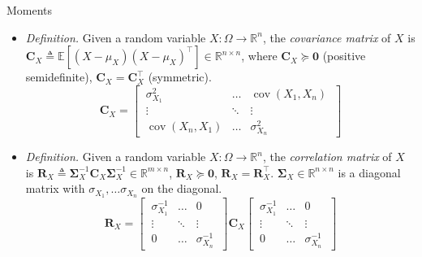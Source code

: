 \documentclass{beamer}
\numberwithin{equation}{section}
\begin{document}
\begin{frame}{Moments}
    \begin{itemize}
        \item
        \textit{Definition.} Given a random variable $ X : \Omega \rightarrow
        \mathbb{R}^n $, the \textit{covariance matrix} of $ X $ is
        $ \mathbf{C}_X \triangleq \mathbb{E}\left[(X - \mu_X)
        (X - \mu_X)^\top\right] \in \mathbb{R}^{n \times n} $, where
        $ \mathbf{C}_X \succeq \mathbf{0} $ (positive semidefinite),
        $ \mathbf{C}_X = \mathbf{C}_X^\top $ (symmetric).
        \begin{equation*}
            \mathbf{C}_X = \begin{bmatrix}
                \ \sigma_{X_1}^2 & \ldots & \operatorname{cov}(X_1, X_n) \ \\
                \ \vdots & \ddots & \vdots \ \\
                \ \operatorname{cov}(X_n, X_1) & \ldots & \sigma_{X_n}^2 \
            \end{bmatrix}
        \end{equation*}

        \item
        \textit{Definition.} Given a random variable $ X : \Omega \rightarrow
        \mathbb{R}^n $, the \textit{correlation matrix} of $ X $ is
        $ \mathbf{R}_X \triangleq \mathbf{\Sigma}_X^{-1}\mathbf{C}_X
        \mathbf{\Sigma}_X^{-1} \in \mathbb{R}^{m \times n} $, $ \mathbf{R}_X
        \succeq \mathbf{0} $, $ \mathbf{R}_X = \mathbf{R}_X^\top $.
        $ \mathbf{\Sigma}_X \in \mathbb{R}^{n \times n} $ is a diagonal matrix
        with $ \sigma_{X_1}, \ldots \sigma_{X_n} $ on the diagonal.
        \begin{equation*}
            \mathbf{R}_X = \begin{bmatrix}
                \ \sigma_{X_1}^{-1} & \ldots & 0 \ \\
                \ \vdots & \ddots & \vdots \ \\
                \ 0 & \ldots & \sigma_{X_n}^{-1} \
            \end{bmatrix} \mathbf{C}_X \begin{bmatrix}
                \ \sigma_{X_1}^{-1} & \ldots & 0 \ \\
                \ \vdots & \ddots & \vdots \ \\
                \ 0 & \ldots & \sigma_{X_n}^{-1} \
            \end{bmatrix}
        \end{equation*}
    \end{itemize}
\end{frame}
\end{document}

